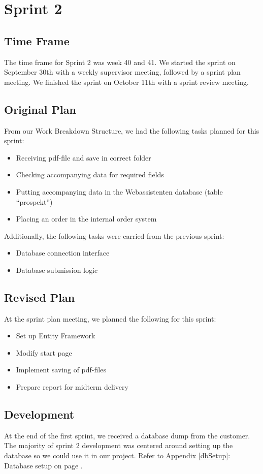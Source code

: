 \section{Sprint 2}

\subsection{Time Frame}
The time frame for Sprint 2 was week 40 and 41. We started the sprint on September 30th with a weekly supervisor meeting, followed by a sprint plan meeting. We finished the sprint on October 11th with a sprint review meeting.

\subsection{Original Plan}
From our Work Breakdown Structure, we had the following tasks planned for this sprint:
\begin{itemize}
	\item Receiving pdf-file and save in correct folder
	\item Checking accompanying data for required fields
	\item Putting accompanying data in the Webassistenten database (table “prospekt”)
	\item Placing an order in the internal order system
\end{itemize}

Additionally, the following tasks were carried from the previous sprint:
\begin{itemize}
	\item Database connection interface
	\item Database submission logic
\end{itemize}

\subsection{Revised Plan}
At the sprint plan meeting, we planned the following for this sprint:
\begin{itemize}
	\item Set up Entity Framework
	\item Modify start page
	\item Implement saving of pdf-files
	\item Prepare report for midterm delivery
\end{itemize}

\subsection{Development}
At the end of the first sprint, we received a database dump from the customer. The majority of sprint 2 development was centered around setting up the database so we could use it in our project. Refer to Appendix \ref{dbSetup}: Database setup on page \pageref{dbSetup}.

